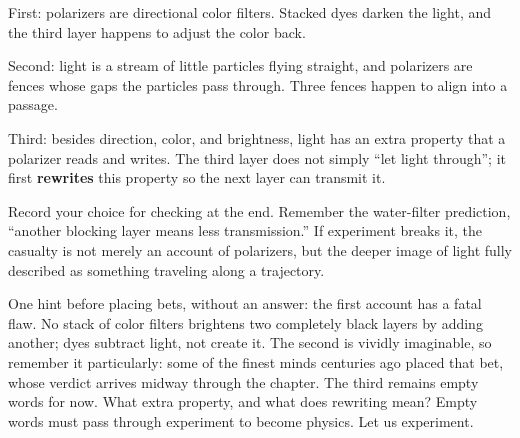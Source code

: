 First: polarizers are directional color filters. Stacked dyes darken the light, and the third layer happens to adjust the color back.

Second: light is a stream of little particles flying straight, and polarizers are fences whose gaps the particles pass through. Three fences happen to align into a passage.

Third: besides direction, color, and brightness, light has an extra property that a polarizer reads and writes. The third layer does not simply ``let light through''; it first \textbf{rewrites} this property so the next layer can transmit it.

Record your choice for checking at the end. Remember the water-filter prediction, ``another blocking layer means less transmission.'' If experiment breaks it, the casualty is not merely an account of polarizers, but the deeper image of light fully described as something traveling along a trajectory.

One hint before placing bets, without an answer: the first account has a fatal flaw. No stack of color filters brightens two completely black layers by adding another; dyes subtract light, not create it. The second is vividly imaginable, so remember it particularly: some of the finest minds centuries ago placed that bet, whose verdict arrives midway through the chapter. The third remains empty words for now. What extra property, and what does rewriting mean? Empty words must pass through experiment to become physics. Let us experiment.


